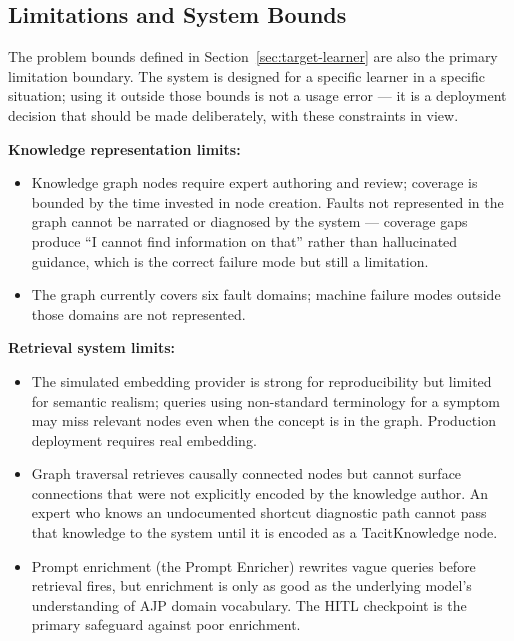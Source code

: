 \documentclass[10pt,letterpaper,twocolumn]{article}
\begin{document}
\subsection{Limitations and System Bounds}
\label{sec:limitations}

The problem bounds defined in Section~\ref{sec:target-learner} are also the primary limitation boundary. The system is designed for a specific learner in a specific situation; using it outside those bounds is not a usage error --- it is a deployment decision that should be made deliberately, with these constraints in view.

\textbf{Knowledge representation limits:}
\begin{itemize}
  \item Knowledge graph nodes require expert authoring and review; coverage is bounded by the time invested in node creation. Faults not represented in the graph cannot be narrated or diagnosed by the system --- coverage gaps produce ``I cannot find information on that'' rather than hallucinated guidance, which is the correct failure mode but still a limitation.
  \item The graph currently covers six fault domains; machine failure modes outside those domains are not represented.
\end{itemize}

\textbf{Retrieval system limits:}
\begin{itemize}
  \item The simulated embedding provider is strong for reproducibility but limited for semantic realism; queries using non-standard terminology for a symptom may miss relevant nodes even when the concept is in the graph. Production deployment requires real embedding.
  \item Graph traversal retrieves causally connected nodes but cannot surface connections that were not explicitly encoded by the knowledge author. An expert who knows an undocumented shortcut diagnostic path cannot pass that knowledge to the system until it is encoded as a TacitKnowledge node.
  \item Prompt enrichment (the Prompt Enricher) rewrites vague queries before retrieval fires, but enrichment is only as good as the underlying model's understanding of AJP domain vocabulary. The HITL checkpoint is the primary safeguard against poor enrichment.
\end{itemize}
\end{document}
